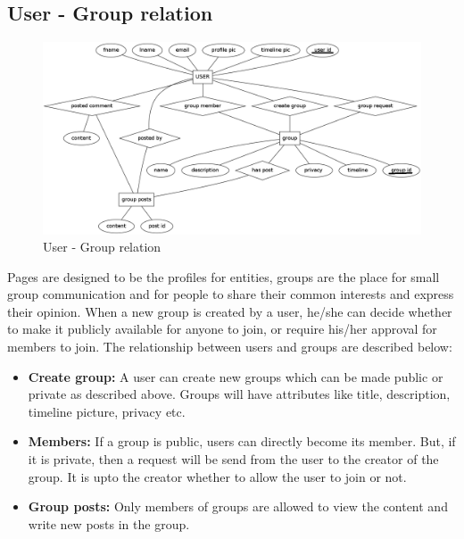 \documentclass{article}
\begin{document}
\subsection{User - Group relation}
\begin{figure}[h]
\centering
\includegraphics[scale=0.35]{user_groups.png}
\caption{User - Group relation}
\label{fig3}
\end{figure}
Pages are designed to be the profiles for entities, groups are the place for small group communication and for people to share their common interests and express their opinion. When a new group is created by a user, he/she can decide whether to make it publicly available for anyone to join, or require his/her approval for members to join. The relationship between users and groups are described below:
\begin{itemize}
\item \textbf{Create group:} A user can create new groups which can be made public or private as described above. Groups will have attributes like title, description, timeline picture, privacy etc.
\item \textbf{Members:} If a group is public, users can directly become its member. But, if it is private, then a request will be send from the user to the creator of the group. It is upto the creator whether to allow the user to join or not.
\item \textbf{Group posts:} Only members of groups are allowed to view the content and write new posts in the group.
\end{itemize}
\end{document}
